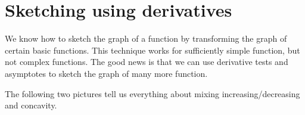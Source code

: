 \documentclass[../main.tex]{subfiles}
\begin{document}
%
%
%
% 
\section{Sketching using derivatives}
  We know how to sketch the graph of a function by transforming the graph of certain basic functions.  This technique works for sufficiently simple function, but not complex functions. The good news is that we can use derivative tests and asymptotes to sketch the graph of many more function.

  The following two pictures tell us everything about mixing increasing/decreasing and concavity.
  \begin{center}
    \hspace{1in}
  \end{center}
\end{document}
